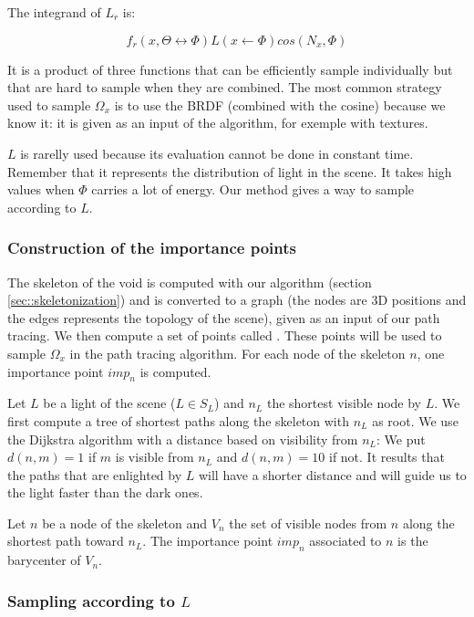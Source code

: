 The integrand of $L_r$ is:

\begin{equation*}
f_r(x, \Theta \leftrightarrow \Phi) L(x \leftarrow \Phi) cos(N_x, \Phi)
\end{equation*}

It is a product of three functions that can be efficiently sample individually but that are hard to sample when they are combined. The most common strategy used to sample $\Omega_x$ is to use the BRDF (combined with the cosine) because we know it: it is given as an input of the algorithm, for exemple with textures.

$L$ is rarelly used because its evaluation cannot be done in constant time. Remember that it represents the distribution of light in the scene. It takes high values when $\Phi$ carries a lot of energy. Our method gives a way to sample according to $L$.

\subsubsection{Construction of the importance points}

The skeleton of the void is computed with our algorithm (section \ref{sec::skeletonization}) and is converted to a graph (the nodes are 3D positions and the edges represents the topology of the scene), given as an input of our path tracing. We then compute a set of points called . These points will be used to sample $\Omega_x$ in the path tracing algorithm. For each node of the skeleton $n$, one importance point $imp_n$ is computed.

Let $L$ be a light of the scene ($L \in S_L$) and $n_L$ the shortest visible node by $L$. We first compute a tree of shortest paths along the skeleton with $n_L$ as root. We use the Dijkstra algorithm with a distance based on visibility from $n_L$: We put $d(n, m) = 1$ if $m$ is visible from $n_L$ and $d(n, m) = 10$ if not. It results that the paths that are enlighted by $L$ will have a shorter distance and will guide us to the light faster than the dark ones.

Let $n$ be a node of the skeleton and $V_n$ the set of visible nodes from $n$ along the shortest path toward $n_L$. The importance point $imp_n$ associated to $n$ is the barycenter of $V_n$.

\subsubsection{Sampling according to $L$}

